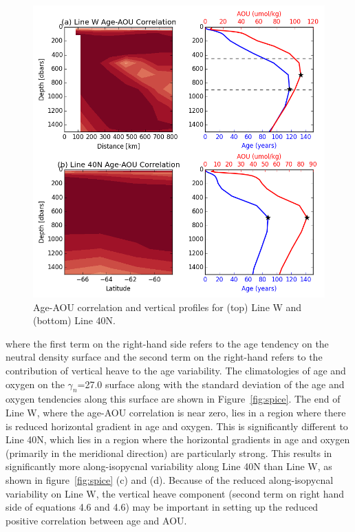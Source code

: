 \begin{figure}
\centering
\includegraphics[width=\linewidth]{age_aou_corr_linew_line40N.png}
\caption{Age-AOU correlation and vertical profiles for (top) Line W and (bottom) Line 40N.}
\label{fig:vertical_profile}
\end{figure}

where the first term on the right-hand side refers to the age tendency on the
neutral density surface and the second term on the right-hand refers to the
contribution of vertical heave to the age variability. The climatologies of age
and oxygen on the $\gamma_n$=27.0 surface along with the standard deviation of the age
and oxygen tendencies along this surface are shown in Figure~\ref{fig:spice}.
The end of Line W, where the age-AOU correlation is near zero, lies in a
region where there is reduced horizontal gradient in age and oxygen. This is
significantly different to Line 40N, which lies in a region where the horizontal
gradients in age and oxygen (primarily in the meridional direction) are
particularly strong. This results in significantly more along-isopycnal variability
along Line 40N than Line W, as shown in figure~\ref{fig:spice} (c) and (d).
Because of the reduced along-isopycnal variability on Line W, the vertical heave
component (second term on right hand side of equations 4.6 and 4.6) may be important
in setting up the reduced positive correlation between age and AOU.

